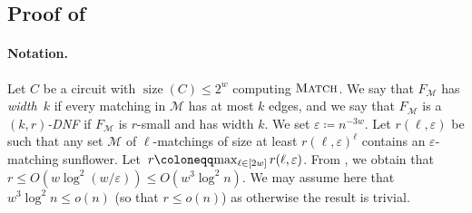 \documentclass[11pt]{article}
\theoremstyle{plain}
\theoremstyle{definition}
\theoremstyle{remark}
\newcommand{\eps}{\varepsilon}
\newcommand{\PM}{\textsc{Match}}
\def\calm{{\mathcal M}}
\begin{document}
\subsection{Proof of \texorpdfstring{}{Lemma \ref{lem:dnfs-approximate-intro}}}
\label{sec:proof-approx}

\paragraph{Notation.}
Let $C$ be a circuit with $\operatorname{size}(C)\leq 2^w$ computing $\PM$.
We say that 
$F_\calm$ has \emph{width~$k$}
if
every matching in $\calm$ has at most $k$ edges,
and
we say that 
$F_{\calm}$
is a
\emph{$(k,r)$-DNF}
if
$F_{\calm}$ is $r$-small and has width $k$.
We set $\eps \coloneqq n^{-3w}$.
Let $r(\ell, \eps)$ be such that any set $\calm$ of $\ell$-matchings of size
at least $r(\ell,\eps)^\ell$ contains an $\eps$-matching sunflower.
Let~$r \coloneqq \smash{\max_{\ell \in [2w]} r(\ell,\eps)}$.
From , we
obtain that $r \leq O(w \log^2(w/\eps)) \leq O(w^3 \log^2 n)$. We may assume here that $w^3 \log^2n \leq o(n)$ (so that $r\leq o(n)$) as otherwise the result is trivial. 
\end{document}
